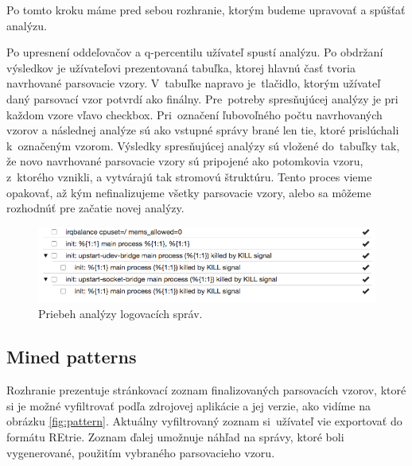 Po tomto kroku máme pred sebou rozhranie, ktorým budeme upravovať a spúšťať analýzu.
\par Po upresnení oddeľovačov a q-percentilu užívateľ spustí analýzu. Po obdržaní výsledkov je užívateľovi prezentovaná tabuľka, ktorej hlavnú časť tvoria navrhované parsovacie vzory. V~tabuľke napravo je~tlačidlo, ktorým užívateľ daný parsovací vzor potvrdí ako finálny. Pre~potreby spresňujúcej analýzy je pri každom vzore vľavo checkbox. Pri~označení ľubovoľného počtu navrhovaných vzorov a následnej analýze sú ako vstupné správy brané len tie, ktoré prislúchali k~označeným vzorom. Výsledky spresňujúcej analýzy sú vložené do~tabuľky tak, že novo navrhované parsovacie vzory sú pripojené ako potomkovia vzoru, z~ktorého vznikli, a vytvárajú tak stromovú štruktúru. Tento proces vieme opakovať, až kým nefinalizujeme všetky parsovacie vzory, alebo sa môžeme rozhodnúť pre začatie novej analýzy.

\begin{figure}[htbp]
 \centering 
 \begin{minipage}{0.95\linewidth}
 	\centering
 	\includegraphics[width=\textwidth]{Images/thesis-miner-analysis.png}
 \end{minipage}
  \caption{Priebeh analýzy logovacích správ.}
  \label{fig:miner-source}
\end{figure}

\subsection{Mined patterns}
Rozhranie prezentuje stránkovací zoznam finalizovaných parsovacích vzorov, ktoré si je možné vyfiltrovať podľa zdrojovej aplikácie a jej verzie, ako vidíme na obrázku \ref{fig:pattern}. Aktuálny vyfiltrovaný zoznam si~užívateľ vie exportovať do formátu REtrie. Zoznam ďalej umožnuje náhľad na správy, ktoré boli vygenerované, použitím vybraného parsovacieho vzoru.

